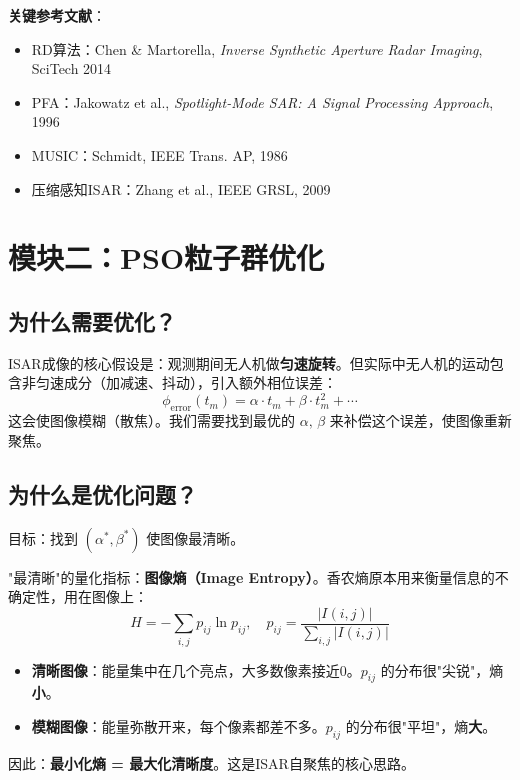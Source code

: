 \documentclass[12pt, a4paper]{article}
\begin{document}
\textbf{关键参考文献}：
\begin{itemize}
  \item RD算法：Chen \& Martorella, \textit{Inverse Synthetic Aperture Radar Imaging}, SciTech 2014
  \item PFA：Jakowatz et al., \textit{Spotlight-Mode SAR: A Signal Processing Approach}, 1996
  \item MUSIC：Schmidt, IEEE Trans. AP, 1986
  \item 压缩感知ISAR：Zhang et al., IEEE GRSL, 2009
\end{itemize}

\section{模块二：PSO粒子群优化}

\subsection{为什么需要优化？}

ISAR成像的核心假设是：观测期间无人机做\textbf{匀速旋转}。但实际中无人机的运动包含非匀速成分（加减速、抖动），引入额外相位误差：
\begin{equation}
\phi_\text{error}(t_m) = \alpha \cdot t_m + \beta \cdot t_m^2 + \cdots
\end{equation}
这会使图像模糊（散焦）。我们需要找到最优的 $\alpha,\,\beta$ 来补偿这个误差，使图像重新聚焦。

\subsection{为什么是优化问题？}

目标：找到 $(\alpha^*, \beta^*)$ 使图像最清晰。

"最清晰"的量化指标：\textbf{图像熵（Image Entropy）}。香农熵原本用来衡量信息的不确定性，用在图像上：
\begin{equation}
H = -\sum_{i,j} p_{ij} \ln p_{ij}, \quad p_{ij} = \frac{|I(i,j)|}{\sum_{i,j}|I(i,j)|}
\end{equation}

\begin{intubox}[熵与清晰度的关系]
\begin{itemize}
  \item \textbf{清晰图像}：能量集中在几个亮点，大多数像素接近0。$p_{ij}$ 的分布很"尖锐"，熵\textbf{小}。
  \item \textbf{模糊图像}：能量弥散开来，每个像素都差不多。$p_{ij}$ 的分布很"平坦"，熵\textbf{大}。
\end{itemize}
因此：\textbf{最小化熵 = 最大化清晰度}。这是ISAR自聚焦的核心思路。
\end{intubox}
\end{document}
